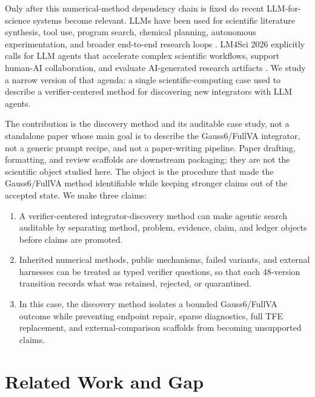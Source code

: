 \documentclass[10pt]{article}
\newcommand{\method}{Gauss6/\allowbreak FullVA}
\newcommand{\tfe}{TFE}
\begin{document}
Only after this numerical-method dependency chain is fixed do recent
LLM-for-science systems become relevant. LLMs have been used for scientific
literature synthesis, tool use, program search, chemical planning, autonomous
experimentation, and broader end-to-end research loops
\citep{Wang2023AIScience,Boiko2023Coscientist,
Bran2024ChemCrow,RomeraParedes2024FunSearch,Lu2024AIScientist}. LM4Sci 2026
explicitly calls for LLM agents that accelerate complex scientific workflows,
support human-AI collaboration, and evaluate AI-generated research artifacts
\citep{LM4Sci2026CFP}. We study a narrow version of that agenda: a single
scientific-computing case used to describe a verifier-centered method for
discovering new integrators with LLM agents.

The contribution is the discovery method and its auditable case study, not a
standalone paper whose main goal is to describe the \method{} integrator, not a
generic prompt recipe, and not a paper-writing pipeline. Paper drafting,
formatting, and review scaffolds are downstream packaging; they are not the
scientific object studied here. The object is the procedure that made the
\method{} method identifiable while keeping stronger claims out of the
accepted state.
We make three claims:

\begin{enumerate}
  \item A verifier-centered integrator-discovery method can make agentic search
  auditable by separating method, problem, evidence, claim, and ledger objects
  before claims are promoted.
  \item Inherited numerical methods, public mechanisms, failed variants, and
  external harnesses can be treated as typed verifier questions, so that each
  48-version transition records what was retained, rejected, or quarantined.
  \item In this case, the discovery method isolates a bounded \method{} outcome
  while preventing endpoint repair, sparse diagnostics, full \tfe{}
  replacement, and external-comparison scaffolds from becoming unsupported
  claims.
\end{enumerate}

\section{Related Work and Gap}
\end{document}

